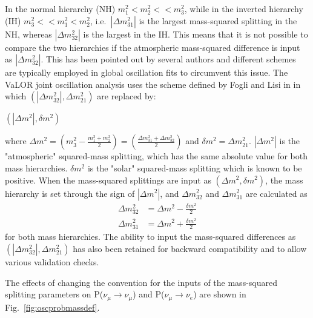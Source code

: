 In the normal hierarchy (NH) $m_{1}^{2}<m_{2}^{2}<<m_{3}^{2}$, while in the inverted hierarchy (IH) $m_{3}^{2}<<m_{1}^{2}<m_{2}^{2}$,
i.e.\ $|\Delta m_{31}^{2}|$ is the largest mass-squared splitting in the NH, whereas $|\Delta m_{32}^{2}|$ is the largest in the IH. 
This means that it is not possible to compare the two hierarchies if the atmospheric mass-squared difference is input as 
$|\Delta m_{32}^{2}|$. This has been pointed out by several authors and different schemes are typically employed in global
oscillation fits to circumvent this issue. The VaLOR joint oscillation analysis uses the scheme defined by Fogli and Lisi in 
\cite{LisiGlobalAnalysis} \cite{Fogli} in which $\left( |\Delta m_{32}^{2}|, \Delta m_{21}^{2} \right)$ are replaced by:
\begin{center}
$\left( |\Delta m^{2}|, \delta m^{2} \right)$
\end{center}
where 
$\Delta m^{2} = \left(m_{3}^{2} - \frac {m_{1}^{2}+m_{2}^{2}} {2} \right) =  \left( \frac {\Delta m_{31}^{2} + \Delta m_{32}^{2}} {2} \right)$
and 
$\delta m^{2} = \Delta m_{21}^{2}$.
$|\Delta m^{2}|$ is the "atmospheric" squared-mass splitting, which has the same absolute value for both mass hierarchies.
$\delta m^{2}$ is the "solar" squared-mass splitting which is known to be positive. When the mass-squared splittings are input as 
$\left(\Delta m^{2}, \delta m^{2} \right)$, the mass hierarchy is set through the sign of $|\Delta m^{2}|$, and $\Delta m_{32}^{2}$ 
and $\Delta m_{31}^{2}$ are calculated as 
\begin{displaymath}
\begin{split}
\Delta m_{32}^{2} &= \Delta m^{2} - \frac{\delta m^{2}}{2}  \\
\Delta m_{31}^{2} &= \Delta m^{2} + \frac{\delta m^{2}}{2}
\end{split}
\end{displaymath}
for both mass hierarchies. The ability to input the mass-squared differences as $\left( |\Delta m_{32}^{2}|, \Delta m_{21}^{2} \right)$ has also been retained for 
backward compatibility and to allow various validation checks.

The effects of changing the convention for the inputs of the mass-squared splitting parameters on P($\nu_{\mu}\rightarrow\nu_{\mu}$) 
and P($\nu_{\mu}\rightarrow\nu_{e}$) are shown in Fig.\ \ref{fig:oscprobmassdef}. 

